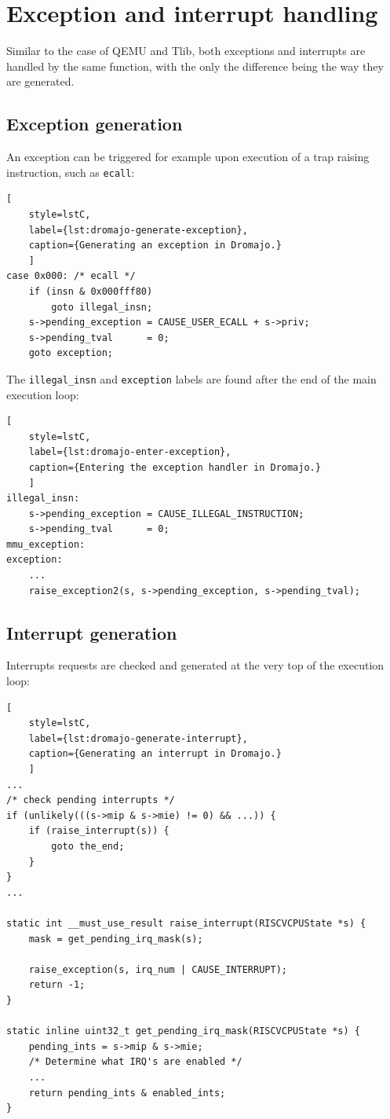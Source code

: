 \section{Exception and interrupt handling}

Similar to the case of QEMU and Tlib, both exceptions and interrupts are handled by the same function, with the only
the difference being the way they are generated.

\subsection*{Exception generation}

An exception can be triggered for example upon execution of a trap raising instruction, such as \texttt{ecall}:

\begin{lstlisting}[
    style=lstC,
    label={lst:dromajo-generate-exception},
    caption={Generating an exception in Dromajo.}
    ]
case 0x000: /* ecall */
    if (insn & 0x000fff80)
        goto illegal_insn;
    s->pending_exception = CAUSE_USER_ECALL + s->priv;
    s->pending_tval      = 0;
    goto exception;
\end{lstlisting}

\pagebreak

\noindent
The \texttt{illegal\_insn} and \texttt{exception} labels are found after the end of the main execution loop:

\begin{lstlisting}[
    style=lstC,
    label={lst:dromajo-enter-exception},
    caption={Entering the exception handler in Dromajo.}
    ]
illegal_insn:
    s->pending_exception = CAUSE_ILLEGAL_INSTRUCTION;
    s->pending_tval      = 0;
mmu_exception:
exception:
    ...
    raise_exception2(s, s->pending_exception, s->pending_tval);
\end{lstlisting}

\subsection*{Interrupt generation}

Interrupts requests are checked and generated at the very top of the execution loop:

\begin{lstlisting}[
    style=lstC,
    label={lst:dromajo-generate-interrupt},
    caption={Generating an interrupt in Dromajo.}
    ]
...
/* check pending interrupts */
if (unlikely(((s->mip & s->mie) != 0) && ...)) {
    if (raise_interrupt(s)) {
        goto the_end;
    }
}
...

static int __must_use_result raise_interrupt(RISCVCPUState *s) {
    mask = get_pending_irq_mask(s);

    raise_exception(s, irq_num | CAUSE_INTERRUPT);
    return -1;
}

static inline uint32_t get_pending_irq_mask(RISCVCPUState *s) {
    pending_ints = s->mip & s->mie;
    /* Determine what IRQ's are enabled */
    ...
    return pending_ints & enabled_ints;
}
\end{lstlisting}

